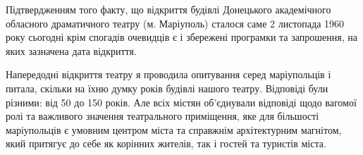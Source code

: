 Підтвердженням того факту, що відкриття будівлі Донецького академічного
обласного драматичного театру (м. Маріуполь) сталося саме 2 листопада 1960 року
сьогодні крім спогадів очевидців є і збережені програмки та запрошення, на яких
зазначена дата відкриття.

Напередодні відкриття театру я проводила опитування серед маріупольців і
питала, скільки на їхню думку років будівлі нашого театру. Відповіді були
різними: від 50 до 150 років. Але всіх містян об'єднували відповіді щодо
вагомої ролі та важливого значення театрального приміщення, яке для більшості
маріупольців є умовним центром міста та справжнім архітектурним магнітом, який
притягує до себе як корінних жителів, так і гостей та туристів міста.

